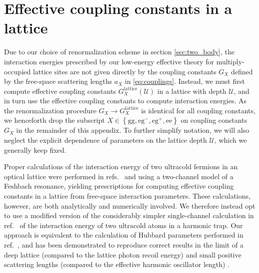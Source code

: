 \documentclass[preprint,showkeys,nofootinbib]{revtex4-1}
\renewcommand{\t}{\text} %
\newcommand{\p}[1]{\left(#1\right)} %
\renewcommand{\set}[1]{\left\{#1\right\}} %
\newcommand{\g}{\text{g}}
\newcommand{\e}{\text{e}}
\newcommand{\U}{\mathcal{U}}
\newcommand{\1}{\mathds{1}}
\begin{document}
\section{Effective coupling constants in a lattice}
\label{sec:renormalization}

Due to our choice of renormalization scheme in section
\ref{sec:two_body}, the interaction energies prescribed by our
low-energy effective theory for multiply-occupied lattice sites are
not given directly by the coupling constants $G_X$ defined by the
free-space scattering lengths $a_X$ in \eqref{eq:couplings}.  Instead,
we must first compute effective coupling constants
$G_X^{\t{lattice}}\p{\U}$ in a lattice with depth $\U$, and in turn
use the effective coupling constants to compute interaction energies.
As the renormalization procedure $G_X\to G_X^{\t{lattice}}$ is
identical for all coupling constants, we henceforth drop the subscript
$X\in\set{\g\g,\e\g^-,\e\g^+,\e\e}$ on coupling constants $G_X$ in the
remainder of this appendix.  To further simplify notation, we will
also neglect the explicit dependence of parameters on the lattice
depth $\U$, which we generally keep fixed.

Proper calculations of the interaction energy of two ultracold
fermions in an optical lattice were performed in
refs.~\cite{buchler2010microscopic} and \cite{wall2013strongly} using
a two-channel model of a Feshbach resonance, yielding prescriptions
for computing effective coupling constants in a lattice from
free-space interaction parameters.  These calculations, however, are
both analytically and numerically involved.  We therefore instead opt
to use a modified version of the considerably simpler single-channel
calculation in ref.~\cite{busch1998two} of the interaction energy of
two ultracold atoms in a harmonic trap.  Our approach is equivalent to
the calculation of Hubbard parameters performed in
ref.~\cite{dickerscheid2005feshbach}, and has been demonstrated to
reproduce correct results in the limit of a deep lattice (compared to
the lattice photon recoil energy) and small positive scattering
lengths (compared to the effective harmonic oscillator length)
\cite{buchler2010microscopic}.
\end{document}
